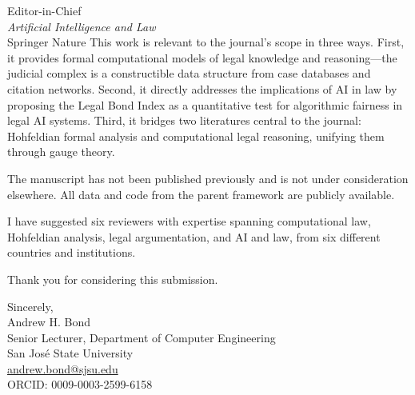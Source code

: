 \documentclass[12pt]{letter}
\begin{document}
\begin{letter}{%
Editor-in-Chief\\
\emph{Artificial Intelligence and Law}\\
Springer Nature}
This work is relevant to the journal's scope in three ways.  First, it provides formal computational models of legal knowledge and reasoning---the judicial complex is a constructible data structure from case databases and citation networks.  Second, it directly addresses the implications of AI in law by proposing the Legal Bond Index as a quantitative test for algorithmic fairness in legal AI systems.  Third, it bridges two literatures central to the journal: Hohfeldian formal analysis and computational legal reasoning, unifying them through gauge theory.

The manuscript has not been published previously and is not under consideration elsewhere.  All data and code from the parent framework are publicly available.

I have suggested six reviewers with expertise spanning computational law, Hohfeldian analysis, legal argumentation, and AI and law, from six different countries and institutions.

Thank you for considering this submission.

\closing{Sincerely,\\[2em]
Andrew H. Bond\\
Senior Lecturer, Department of Computer Engineering\\
San Jos\'{e} State University\\
\href{mailto:andrew.bond@sjsu.edu}{andrew.bond@sjsu.edu}\\
ORCID: 0009-0003-2599-6158}

\end{letter}
\end{document}
